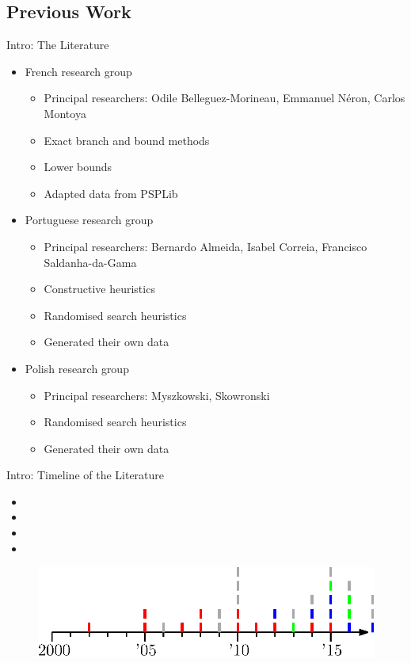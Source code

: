 \documentclass{beamer}
\begin{document}
\subsection{Previous Work}
\begin{frame}{Intro: The Literature}
	\begin{itemize}
		\item French research group
		\begin{itemize}
			\item Principal researchers: Odile Belleguez-Morineau, Emmanuel N\'{e}ron, Carlos Montoya
			\item Exact branch and bound methods
			\item Lower bounds
			\item Adapted data from PSPLib\pause
		\end{itemize}	
		\vspace{2mm}
		\item Portuguese research group
		\begin{itemize}
			\item Principal researchers: Bernardo Almeida, Isabel Correia, Francisco Saldanha-da-Gama
			\item Constructive heuristics
			\item Randomised search heuristics
			\item Generated their own data\pause
		\end{itemize}
		\vspace{2mm}
		\item Polish research group
		\begin{itemize}
			\item Principal researchers: Myszkowski, Skowronski
			\item Randomised search heuristics
			\item Generated their own data
		\end{itemize}
	\end{itemize}
\end{frame}

\begin{frame}{Intro: Timeline of the Literature}
	\begin{itemize}
		\item \color{red}{French} 
		\item \color{blue}{Portuguese} 
		\item \color{green}{Polish} 
		\item \color{darkgray}{Other} 
	\end{itemize}
	\begin{figure}[H]
		\includegraphics[width=0.8\linewidth]{images/lit_timeline.eps}
	\end{figure}
\end{frame}
\end{document}
